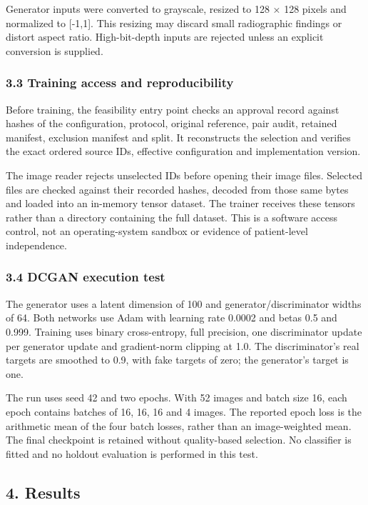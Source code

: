 \documentclass[
]{article}
\begin{document}
Generator inputs were converted to grayscale, resized to 128 × 128
pixels and normalized to {[}-1,1{]}. This resizing may discard small
radiographic findings or distort aspect ratio. High-bit-depth inputs are
rejected unless an explicit conversion is supplied.

\subsubsection{3.3 Training access and
reproducibility}\label{training-access-and-reproducibility}

Before training, the feasibility entry point checks an approval record
against hashes of the configuration, protocol, original reference, pair
audit, retained manifest, exclusion manifest and split. It reconstructs
the selection and verifies the exact ordered source IDs, effective
configuration and implementation version.

The image reader rejects unselected IDs before opening their image
files. Selected files are checked against their recorded hashes, decoded
from those same bytes and loaded into an in-memory tensor dataset. The
trainer receives these tensors rather than a directory containing the
full dataset. This is a software access control, not an operating-system
sandbox or evidence of patient-level independence.

\subsubsection{3.4 DCGAN execution test}\label{dcgan-execution-test}

The generator uses a latent dimension of 100 and generator/discriminator
widths of 64. Both networks use Adam with learning rate 0.0002 and betas
0.5 and 0.999. Training uses binary cross-entropy, full precision, one
discriminator update per generator update and gradient-norm clipping at
1.0. The discriminator's real targets are smoothed to 0.9, with fake
targets of zero; the generator's target is one.

The run uses seed 42 and two epochs. With 52 images and batch size 16,
each epoch contains batches of 16, 16, 16 and 4 images. The reported
epoch loss is the arithmetic mean of the four batch losses, rather than
an image-weighted mean. The final checkpoint is retained without
quality-based selection. No classifier is fitted and no holdout
evaluation is performed in this test.

\subsection{4. Results}\label{results}
\end{document}
